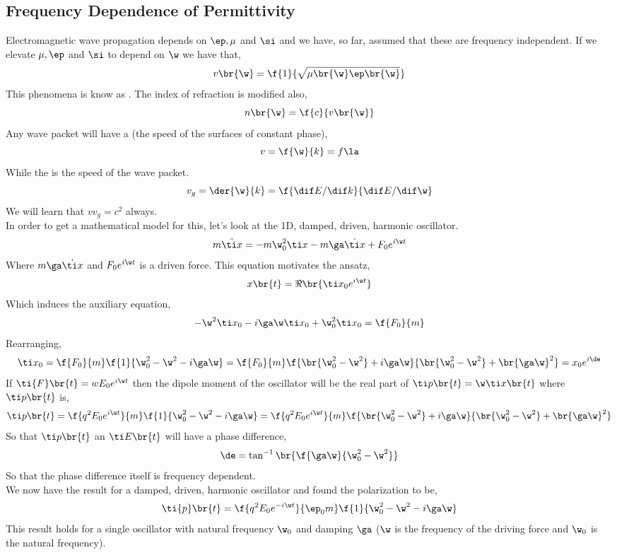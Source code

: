 \documentclass{article}
\begin{document}
\subsection{Frequency Dependence of Permittivity}
Electromagnetic wave propagation depends on $\ep, \mu$ and $\si$ and we have, so far, assumed that these are frequency independent. If we elevate $\mu, \ep$ and $\si$ to depend on $\w$ we have that,
\[ v\br{\w} = \f{1}{\sqrt{\mu\br{\w} \ep \br{\w}}} \]
This phenomena is know as . The index of refraction is modified also,
\[ n \br{\w} = \f{c}{v\br{\w}} \]
Any wave packet will have a  (the speed of the surfaces of constant phase),
\[ v = \f{\w}{k} = f \la \]
While the  is the speed of the wave packet.
\[ v_g = \der{\w}{k} = \f{\dif E / \dif k}{\dif E / \dif \w} \]
We will learn that $v v_g = c^2$ always.\\

In order to get a mathematical model for this, let's look at the 1D, damped, driven, harmonic oscillator.
\[ m \ddot {\ti x} = - m\w_0^2 {\ti x} - m \ga \dot {\ti x} + F_0 e^{i \w t} \]
Where $m \ga \dot {\ti x}$ and $F_0 e^{i \w t}$ is a driven force. This equation motivates the ansatz,
\[ x\br{t} = \Re\br{\ti x_0 e^{i\w t}} \]
Which induces the auxiliary equation,
\[ - \w^2 \ti x_0 - i \ga \w \ti x_0 + \w_0^2 \ti x_0 = \f{F_0}{m} \]
Rearranging,
\[ \ti x_0 = \f{F_0}{m} \f{1}{\w_0^2 - \w^2 - i \ga \w} = \f{F_0}{m} \f{\br{\w_0^2 - \w^2} + i \ga \w}{\br{\w_0^2 - \w^2} + \br{\ga \w}^2} = x_0 e^{i \de} \]
If $\ti{F}\br{t} = w E_0 e^{i \w t}$ then the dipole moment of the oscillator will be the real part of $\ti p \br{t} = \w \ti x \br{t}$ where $\ti p \br{t}$ is,
\[ \ti p \br{t} = \f{q^2 E_0 e^{i \w t}}{m} \f{1}{\w_0^2 - \w^2 - i \ga \w} = \f{q^2 E_0 e^{i \w t}}{m} \f{\br{\w_0^2 - \w^2} + i \ga \w}{\br{\w_0^2 - \w^2} + \br{\ga \w}^2} \]
So that $\ti p \br{t}$ an $\ti E\br{t}$ will have a phase difference,
\[ \de = \tan^{-1} \br{\f{\ga \w}{\w_0^2 - \w^2}} \]
So that the phase difference itself is frequency dependent. \\

We now have the result for a damped, driven, harmonic oscillator and found the  polarization to be,
\[ \ti{p}\br{t} = \f{q^2 E_0 e^{-i\w t}}{\ep_0 m} \f{1}{\w_0^2 - \w^2 - i \ga \w} \]
This result holds for a single oscillator with natural frequency $\w_0$ and damping $\ga$ ($\w$ is the frequency of the driving force and $\w_0$ is the natural frequency).\\
\end{document}
